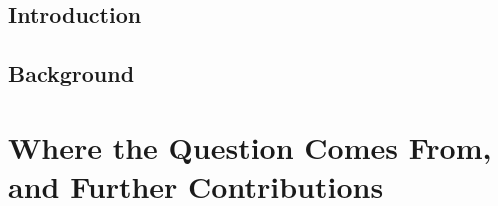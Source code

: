 \documentclass[
	fontsize=10pt, %
	twoside=true, %
	secnumdepth=3, %
	numbers=noenddot, %
]{kaobook}
\begin{document}
\chapter{Introduction}\label{chap:introduction}
\margintoc


\chapter{Background}\label{chap:background}
\margintoc



\part{Where the Question Comes From, and Further Contributions}\label{part:agents}





\end{document}
